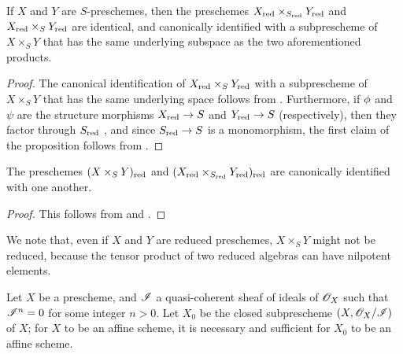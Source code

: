 \begin{prop}[5.1.7]
\label{1.5.1.7}
If $X$ and $Y$ are $S$-preschemes, then the preschemes $X_{\mathrm{red}}\times_{S_{\mathrm{red}}}Y_{\mathrm{red}}$ and $X_{\mathrm{red}}\times_S Y_{\mathrm{red}}$ are identical, and canonically identified with a subprescheme of $X\times_S Y$ that has the same underlying subspace as the two aforementioned products.
\end{prop}

\begin{proof}
\label{proof-1.5.1.7}
The canonical identification of $X_{\mathrm{red}}\times_S Y_{\mathrm{red}}$ with a subprescheme of $X\times_S Y$ that has the same underlying space follows from .
Furthermore, if $\phi$ and $\psi$ are the structure morphisms $X_\red\to S$ and $Y_\red\to S$ (respectively), then they factor through $S_{\mathrm{red}}$ , and since $S_\red\to S$ is a monomorphism, the first claim of the proposition follows from .
\end{proof}

\begin{cor}[5.1.8]
\label{1.5.1.8}
The preschemes $(X\times_S Y)_{\mathrm{red}}$ and $(X_{\mathrm{red}}\times_{S_{\mathrm{red}}}Y_{\mathrm{red}})_{\mathrm{red}}$ are canonically identified with one another.
\end{cor}

\begin{proof}
\label{proof-1.5.1.8}
This follows from  and .
\end{proof}

We note that, even if $X$ and $Y$ are reduced preschemes, $X\times_S Y$ might not be reduced, because the tensor product of two reduced algebras can have nilpotent elements.

\begin{prop}[5.1.9]
\label{1.5.1.9}
Let $X$ be a prescheme, and $\mathscr{I}$ a quasi-coherent sheaf of ideals of $\mathscr{O}_X$ such that $\mathscr{I}^n=0$ for some integer $n>0$.
Let $X_0$ be the closed subprescheme $(X,\mathscr{O}_X/\mathscr{I})$ of $X$;
for $X$ to be an affine scheme, it is necessary and sufficient for $X_0$ to be an affine scheme.
\end{prop}

